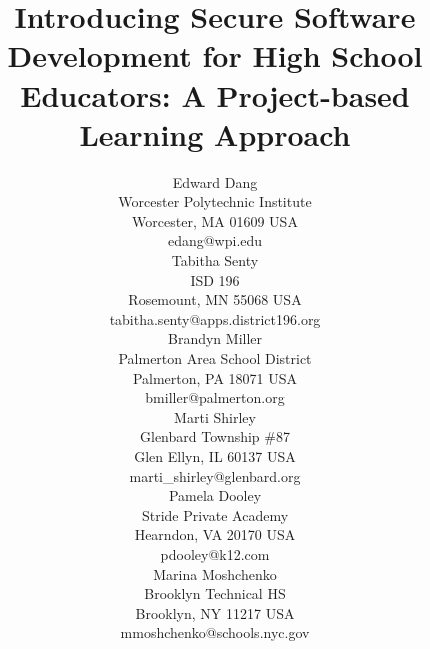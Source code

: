 \documentclass[letterpaper,twocolumn]{article}
\begin{document}
\date{} %
\title{Introducing Secure Software Development for High School Educators: A Project-based Learning Approach}
\author{
        {\rm Edward Dang}\\
        Worcester Polytechnic Institute\\
        Worcester, MA 01609 USA\\
        edang@wpi.edu\\

        {\rm Tabitha Senty}\\
        ISD 196\\
        Rosemount, MN 55068 USA\\
        tabitha.senty@apps.district196.org\\
        
        {\rm Brandyn Miller}\\
        Palmerton Area School District\\
        Palmerton, PA 18071 USA\\
        bmiller@palmerton.org\\
        
        {\rm Marti Shirley}\\
        Glenbard Township \#87\\
        Glen Ellyn, IL 60137 USA\\
        marti\_shirley@glenbard.org\\
        
        {\rm Pamela Dooley}\\
        Stride Private Academy\\
        Hearndon, VA 20170 USA\\
        pdooley@k12.com\\
        
        {\rm Marina Moshchenko}\\
        Brooklyn Technical HS\\
        Brooklyn, NY 11217 USA\\
        mmoshchenko@schools.nyc.gov\\

    }
\maketitle %
\thispagestyle{fancy} %
\end{document}
